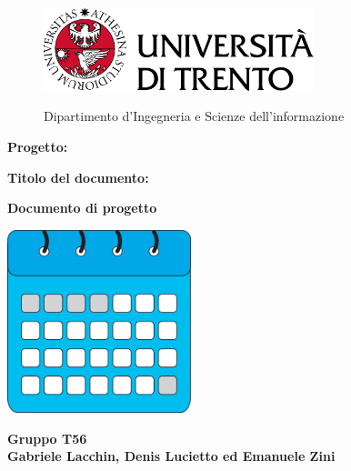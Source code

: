 \begin{titlepage}
    \begin{figure}[!htb]
        \includegraphics[width=0.7\textwidth]{img/logo_unitn.png}
        \endminipage
        \hfill
        \begin{flushright}
            \Large
            Dipartimento d'Ingegneria e Scienze dell'informazione
        \end{flushright}
        \endminipage
        \hfill
    \end{figure}

    \vspace{3cm}

    \large
    \textbf{Progetto:}
    \begin{center}
        \Huge
        \color{blue}
        \textbf{\nome}
    \end{center}

    \vspace{1cm}

    \textbf{Titolo del documento:}
    \begin{center}
        \huge
        \color{blue}
        \textbf{Documento di progetto}\\
    \end{center}

    \vspace{3cm}

    \begin{center}
        \includegraphics[width=0.4\textwidth]{img/Logo/logo.jpg}
    \end{center}
    \vspace{3cm}

    \begin{center}
        \large
        \textbf{Gruppo T56}\\
        \textbf{Gabriele Lacchin, Denis Lucietto ed Emanuele Zini}
    \end{center}

\end{titlepage}
